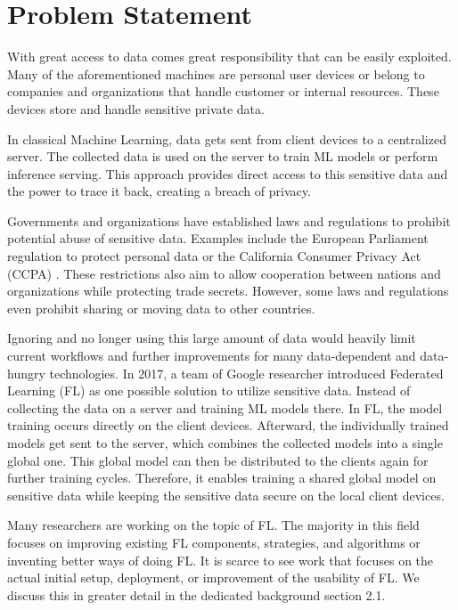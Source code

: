 
\section{Problem Statement}

With great access to data comes great responsibility that can be easily exploited.
Many of the aforementioned machines are personal user devices or belong to
companies and organizations that handle customer or internal resources.
These devices store and handle sensitive private data.

In classical Machine Learning, data gets sent from client devices to a centralized server.
The collected data is used on the server to train ML models or perform inference serving.
This approach provides direct access to this sensitive data and the power to trace it back,
creating a breach of privacy. \cite{book:fl}

Governments and organizations have established laws and regulations to prohibit
potential abuse of sensitive data.
Examples include the European Parliament regulation to protect personal data \cite{eu_regulation}
or the California Consumer Privacy Act (CCPA) \cite{california_consumer_privacy_act}.
These restrictions also aim to allow cooperation between nations and organizations while protecting trade secrets.
However, some laws and regulations even prohibit sharing or moving data to other countries. \cite{book:fl}

Ignoring and no longer using this large amount of data would heavily limit current workflows
and further improvements for many data-dependent and data-hungry technologies.
In 2017, a team of Google researcher introduced Federated Learning (FL)
as one possible solution to utilize sensitive data.
Instead of collecting the data on a server and training ML models there.
In FL, the model training occurs directly on the client devices.
Afterward, the individually trained models get sent to the server,
which combines the collected models into a single global one.
This global model can then be distributed to the clients again for further training cycles.
Therefore, it enables training a shared global model on sensitive data
while keeping the sensitive data secure on the local client devices. \cite{paper:original_fl}

Many researchers are working on the topic of FL.
The majority in this field focuses on improving existing FL
components, strategies, and algorithms or inventing better ways of doing FL.
It is scarce to see work that focuses on the actual initial setup, deployment,
or improvement of the usability of FL.
We discuss this in greater detail in the dedicated background section 2.1.

